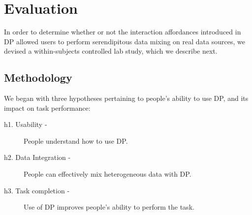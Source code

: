\documentclass{sigchi}
\begin{document}
\section{Evaluation}

In order to determine whether or not the interaction affordances introduced in DP allowed users to perform serendipitous data mixing on real data sources, we devised a within-subjects controlled lab study, which we describe next.

\subsection{Methodology}

We began with three hypotheses pertaining to people's ability to use DP, and its impact on task performance:




\begin{description}
\item [h1. Usability -] People understand how to use DP.
\item [h2. Data Integration -] People can effectively mix heterogeneous data with DP.
\item [h3. Task completion -] Use of DP improves people's ability to perform the task.
\end{description}
\end{document}
